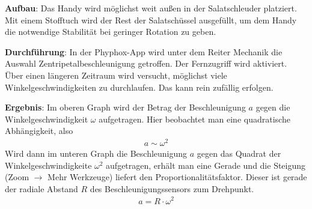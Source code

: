 \documentclass[../main.tex]{subfiles}
\begin{document}
\begin{tcolorbox}
    \vspace{0.7cm}
    \begin{minipage}[]{0.73\textwidth}
        \textbf{Aufbau}: Das Handy wird möglichst weit außen in der Salatschleuder platziert. Mit einem Stofftuch wird der Rest der Salatschüssel ausgefüllt, um dem Handy die notwendige Stabilität bei geringer Rotation zu geben.

        \vspace{0.7cm}
        \textbf{Durchführung}: In der Phyphox-App wird unter dem Reiter \glqq Mechanik\grqq{} die Auswahl \glqq Zentripetalbeschleunigung\grqq{} getroffen. Der Fernzugriff wird aktiviert. Über einen längeren Zeitraum wird versucht, möglichst viele Winkelgeschwindigkeiten zu durchlaufen. Das kann rein zufällig erfolgen.

        \vspace{0.7cm}
        \textbf{Ergebnis}: Im oberen Graph wird der Betrag der Beschleunigung $a$ gegen die Winkelgeschwindigkeit $\omega$ aufgetragen. Hier beobachtet man eine quadratische Abhängigkeit, also
        \begin{align*}
            a \sim \omega^2
        \end{align*}
        Wird dann im unteren Graph die Beschleunigung $a$ gegen das Quadrat der Winkelgeschwindigkeite $\omega^2$ aufgetragen, erhält man eine Gerade und die Steigung (Zoom $\rightarrow$ Mehr Werkzeuge) liefert den Proportionalitätsfaktor. Dieser ist gerade der radiale Abstand $R$ des Beschleunigungssensors zum Drehpunkt. 
        \begin{align*}
            a = R \cdot \omega^2
        \end{align*}
    \end{minipage}
    \hspace{0.2cm}
    \begin{minipage}[]{0.22\textwidth}

\end{minipage}
\end{tcolorbox}
\end{document}
